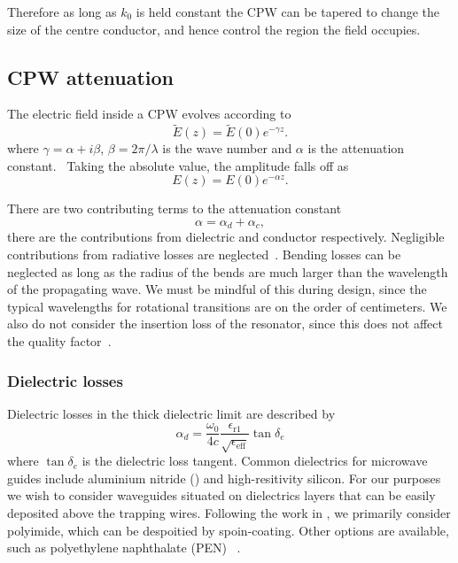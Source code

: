 Therefore as long as $k_0$ is held constant the CPW can be tapered to change the
size of the centre conductor, and hence control the region the field occupies.

\subsection{CPW attenuation}

The electric field inside a CPW evolves according to
%
\begin{equation}
  \widetilde{E}(z) = \widetilde{E}(0)e^{-\gamma z}.
  \label{mws:eqn:Eloss}
\end{equation}
%
where $\gamma = \alpha + i\beta$, $\beta = 2\pi / \lambda$ is the wave
number and $\alpha$ is the attenuation constant.~\cite{Simons2004}
Taking the absolute value, the amplitude falls off as
%
\begin{equation}
  E(z) = E(0)e^{-\alpha z}.
\end{equation}

There are two contributing terms to the attenuation constant
%
\begin{equation}
  \alpha = \alpha_d + \alpha_c,
\end{equation}
%
there are the contributions from dielectric and conductor respectively.
Negligible contributions from radiative losses are
neglected~\cite{Frankel1991}.  Bending losses can be neglected as long as
the radius of the bends are much larger than the wavelength of the propagating
wave. We must be mindful of this during design, since the typical wavelengths
for rotational transitions are on the order of centimeters.
We also do not consider the insertion loss of the resonator, since this does
not affect the quality factor~\cite{doi:10.1063/1.3010859}.

\subsubsection{Dielectric losses}

Dielectric losses in the thick dielectric limit are described
by ~\cite{Collin2007}
\begin{equation}
  \alpha_d =
  \frac{\omega_0}{4c}\frac{\epsilon_\mathrm{r1}}{\sqrt{\epsilon_\mathrm{eff}}}
  \tan \delta_e
\end{equation}
%
where $\tan\delta_e$ is the dielectric loss tangent. Common dielectrics for
microwave guides include aluminium nitride (\AlN{}) and high-resitivity
silicon.  For our purposes we wish to consider waveguides situated on
dielectrics layers that can be easily deposited above the trapping wires.
Following the work in , we primarily consider polyimide, which
can be despoitied by spoin-coating. Other options are available, such as
polyethylene naphthalate (PEN) ~\cite{WEI20169937}.

